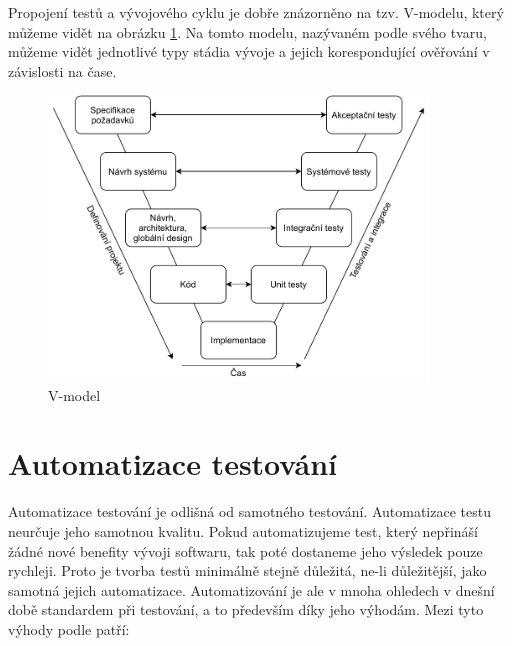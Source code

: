 Propojení testů a vývojového cyklu je dobře znázorněno na tzv. V-modelu, který můžeme vidět na obrázku \ref{fig:vmodel}. Na tomto modelu, nazývaném podle svého tvaru, můžeme vidět jednotlivé typy stádia vývoje a jejich korespondující ověřování v závislosti na čase.

\begin{figure}[htbp]
    \centering 
    \includegraphics[width=0.9\textwidth]{assets/img/vmodel.pdf}
    \caption{V-model}
    \label{fig:vmodel}
\end{figure}


\section{Automatizace testování}

Automatizace testování je odlišná od samotného testování. Automatizace testu neurčuje jeho samotnou kvalitu. Pokud automatizujeme test, který nepřináší žádné nové benefity vývoji softwaru, tak poté dostaneme jeho výsledek pouze rychleji. \cite{fewster1999software} Proto je tvorba testů minimálně stejně důležitá, ne-li důležitější, jako samotná jejich automatizace. Automatizování je ale v mnoha ohledech v dnešní době standardem při testování, a to především díky jeho výhodám. Mezi tyto výhody podle \cite{fewster1999software} patří:

